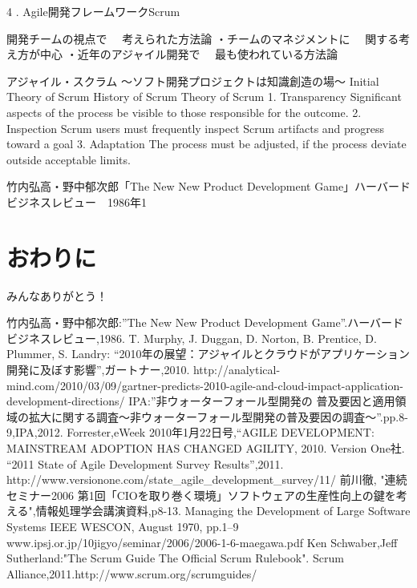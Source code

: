 \documentclass[paper]{jrsj}
\begin{document}
4 . Agile開発フレームワークScrum


開発チームの視点で
　考えられた方法論
・チームのマネジメントに
　関する考え方が中心
・近年のアジャイル開発で
　最も使われている方法論

アジャイル・スクラム
～ソフト開発プロジェクトは知識創造の場～
Initial Theory of Scrum
History of Scrum
Theory of Scrum
1.	Transparency
Significant aspects of the process be visible to those responsible for the outcome.
2.	Inspection
Scrum users must frequently  inspect Scrum artifacts and progress toward a goal
3.	Adaptation
The process must be adjusted, if the process deviate outside acceptable limits.




竹内弘高・野中郁次郎「The New New Product Development Game」ハーバードビジネスレビュー　1986年1


\section{おわりに}

\begin{acknowledgements}
みんなありがとう！
\end{acknowledgements}

\begin{thebibliography}{99}
 竹内弘高・野中郁次郎:”The New New Product Development Game”.ハーバードビジネスレビュー,1986.
 T. Murphy, J. Duggan, D. Norton, B. Prentice, D. Plummer, S. Landry: “2010年の展望：アジャイルとクラウドがアプリケーション開発に及ぼす影響”,ガートナー,2010.
 http://analytical-mind.com/2010/03/09/gartner-predicts-2010-agile-and-cloud-impact-application-development-directions/
 IPA:”非ウォーターフォール型開発の 普及要因と適用領域の拡大に関する調査～非ウォーターフォール型開発の普及要因の調査～”.pp.8-9,IPA,2012.
 Forrester,eWeek 2010年1月22日号,“AGILE DEVELOPMENT: MAINSTREAM ADOPTION HAS CHANGED AGILITY, 2010.
 Version One社. “2011 State of Agile Development Survey Results”,2011.
 http://www.versionone.com/state\_agile\_development\_survey/11/
 前川徹, "連続セミナー2006 第1回「CIOを取り巻く環境」ソフトウェアの生産性向上の鍵を考える",情報処理学会講演資料,p8-13.
 Managing the Development of Large Software Systems
 IEEE WESCON, August 1970, pp.1--9
 www.ipsj.or.jp/10jigyo/seminar/2006/2006-1-6-maegawa.pdf
 Ken Schwaber,Jeff Sutherland:"The Scrum Guide The Official Scrum Rulebook". Scrum Alliance,2011.http://www.scrum.org/scrumguides/
\end{thebibliography}


\begin{biography}
\end{biography}
\end{document}
